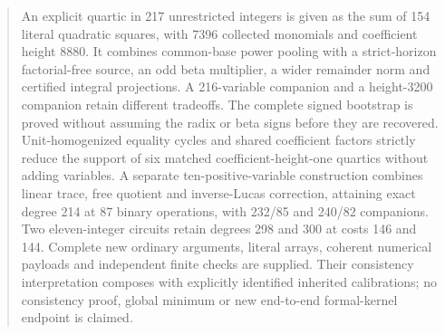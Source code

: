 \begin{abstract}
An explicit quartic in 217 unrestricted integers is given as the sum of
154 literal quadratic squares, with 7396 collected monomials and
coefficient height 8880. It combines common-base power pooling with a
strict-horizon factorial-free source, an odd beta multiplier, a wider
remainder norm and certified integral projections. A 216-variable
companion and a height-3200 companion retain different tradeoffs.
The complete signed bootstrap is proved without assuming the radix or
beta signs before they are recovered. Unit-homogenized equality cycles and shared coefficient factors
strictly reduce the support of six matched coefficient-height-one
quartics without adding variables. A separate ten-positive-variable
construction combines linear trace, free quotient and inverse-Lucas
correction, attaining exact degree 214 at 87 binary operations, with
232/85 and 240/82 companions. Two eleven-integer circuits retain degrees
298 and 300 at costs 146 and 144. Complete new ordinary arguments,
literal arrays, coherent numerical payloads and independent finite checks
are supplied. Their consistency interpretation composes with explicitly
identified inherited calibrations; no consistency proof, global minimum
or new end-to-end formal-kernel endpoint is claimed.
\end{abstract}
